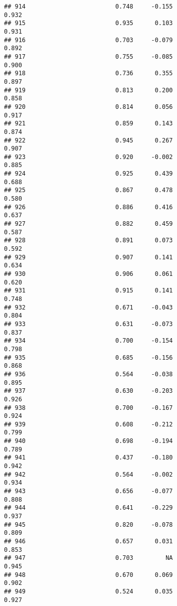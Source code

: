 \documentclass[
]{article}
\begin{document}
\begin{verbatim}
## 914                         0.748     -0.155                     0.932
## 915                         0.935      0.103                     0.931
## 916                         0.703     -0.079                     0.892
## 917                         0.755     -0.085                     0.900
## 918                         0.736      0.355                     0.897
## 919                         0.813      0.200                     0.858
## 920                         0.814      0.056                     0.917
## 921                         0.859      0.143                     0.874
## 922                         0.945      0.267                     0.907
## 923                         0.920     -0.002                     0.885
## 924                         0.925      0.439                     0.688
## 925                         0.867      0.478                     0.580
## 926                         0.886      0.416                     0.637
## 927                         0.882      0.459                     0.587
## 928                         0.891      0.073                     0.592
## 929                         0.907      0.141                     0.634
## 930                         0.906      0.061                     0.620
## 931                         0.915      0.141                     0.748
## 932                         0.671     -0.043                     0.804
## 933                         0.631     -0.073                     0.837
## 934                         0.700     -0.154                     0.798
## 935                         0.685     -0.156                     0.868
## 936                         0.564     -0.038                     0.895
## 937                         0.630     -0.203                     0.926
## 938                         0.700     -0.167                     0.924
## 939                         0.608     -0.212                     0.799
## 940                         0.698     -0.194                     0.789
## 941                         0.437     -0.180                     0.942
## 942                         0.564     -0.002                     0.934
## 943                         0.656     -0.077                     0.808
## 944                         0.641     -0.229                     0.937
## 945                         0.820     -0.078                     0.809
## 946                         0.657      0.031                     0.853
## 947                         0.703         NA                     0.945
## 948                         0.670      0.069                     0.902
## 949                         0.524      0.035                     0.927

\end{verbatim}
\end{document}
